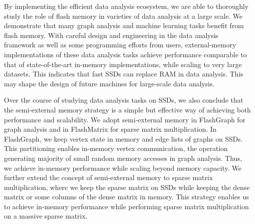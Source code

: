 By implementing the efficient data analysis ecosystem, we are able to thoroughly
study the role of flash memory in varieties of data analysis at a large scale.
We demonstrate that many graph analysis and machine learning tasks benefit from
flash memory. With careful design and engineering in the data analysis framework
as well as some programming efforts from users, external-memory implementations
of these data analysis tasks achieve performance comparable to that of
state-of-the-art in-memory implementations, while scaling to very large datasets.
This indicates that fast SSDs can replace RAM in data analysis. This may shape
the design of future machines for large-scale data analysis.

Over the course of studying data analysis tasks on SSDs, we also conclude that
the semi-external memory strategy is a simple but effective way of achieving
both performance and scalability. We adopt semi-external memory in FlashGraph
for graph analysis and in FlashMatrix for sparse matrix multiplication.
In FlashGraph, we keep vertex state in memory and edge lists of graphs on SSDs.
This partitioning enables in-memory vertex communication, the operation
generating majority of small random memory accesses in graph analysis. Thus, we
achieve in-memory performance while scaling beyond memory capacity. We further
extend the concept of semi-external memory to sparse matrix multiplication,
where we keep the sparse matrix on SSDs while keeping the dense matrix or some
columns of the dense matrix in memory. This strategy enables us to achieve
in-memory performance while performing sparse matrix multiplication on a massive
sparse matrix.
